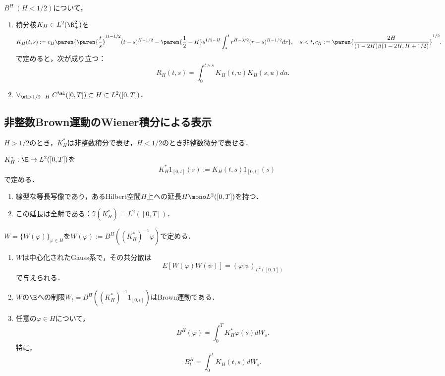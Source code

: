 \documentclass[uplatex,dvipdfmx]{jsreport}
\begin{document}
\begin{proposition}
    $B^H\;(H<1/2)$について，
    \begin{enumerate}
        \item 積分核$K_H\in L^2(\R_+^2)$を
        \[K_H(t,s):=c_H\paren{\paren{\frac{t}{s}}^{H-1/2}(t-s)^{H-1/2}-\paren{\frac{1}{2}-H}s^{1/2-H}\int^t_sr^{H-3/2}(r-s)^{H-1/2}dr},\quad s<t,c_H:=\paren{\frac{2H}{(1-2H)\beta(1-2H,H+1/2)}}^{1/2}.\]
        で定めると，次が成り立つ：
        \[R_H(t,s)=\int^{t\land s}_0K_H(t,u)K_H(s,u)du.\]
        \item $\forall_{\al>1/2-H}\;C^\al([0,T])\subset H\subset L^2([0,T])$．
    \end{enumerate}
\end{proposition}

\subsection{非整数Brown運動のWiener積分による表示}

\begin{tcolorbox}[colframe=ForestGreen, colback=ForestGreen!10!white,breakable,colbacktitle=ForestGreen!40!white,coltitle=black,fonttitle=\bfseries\sffamily,
title=]
    $H>1/2$のとき，$K^*_H$は非整数積分で表せ，$H<1/2$のとき非整数微分で表せる．
\end{tcolorbox}

\begin{proposition}
    $K^*_H:\E\to L^2([0,T])$を
    \[K^*_H1_{[0,t]}(s):=K_H(t,s)1_{[0,t]}(s)\]
    で定める．
    \begin{enumerate}
        \item 線型な等長写像であり，あるHilbert空間$H$上への延長$H\mono L^2([0,T])$を持つ．
        \item この延長は全射である：$\Im(K^*_H)=L^2([0,T])$．
    \end{enumerate}
\end{proposition}

\begin{definition}
    $W=\{W(\varphi)\}_{\varphi\in H}$を$W(\varphi):=B^H((K^*_H)^{-1}\varphi)$で定める．
\end{definition}

\begin{theorem}\mbox{}
    \begin{enumerate}
        \item $W$は中心化されたGauss系で，その共分散は
        \[E[W(\varphi)W(\psi)]=(\varphi|\psi)_{L^2([0,T])}\]
        で与えられる．
        \item $W$の$\E$への制限$W_t=B^H((K^*_H)^{-1}1_{[0,t]})$はBrown運動である．
        \item 任意の$\varphi\in H$について，
        \[B^H(\varphi)=\int^T_0K^*_H\varphi(s)dW_s.\]
        特に，
        \[B^H_t=\int^t_0K_H(t,s)dW_s.\]
    \end{enumerate}
\end{theorem}
\end{document}
